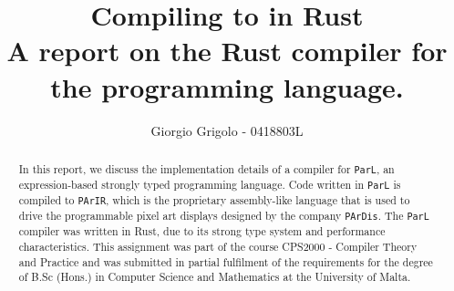 \documentclass{article}
\title{Compiling \code{ParL} to \code{PArIR} in Rust \\{\normalsize A report on the Rust
compiler for the \code{ParL} programming language.}}
\author{Giorgio Grigolo - 0418803L}
\date{}
\newcommand{\code}[1]{\texttt{#1}}
\begin{document}
\vfill

\thispagestyle{empty}
\maketitle
\thispagestyle{empty}

\vfill
\newpage


\thispagestyle{empty}


\newpage

\tableofcontents



\vfill

\begin{abstract}
  \centering
  In this report, we discuss the implementation details of a
  compiler for \code{ParL}, an expression-based strongly typed programming
  language. Code written in \code{ParL} is compiled to \code{PArIR}, which is
  the proprietary assembly-like language that is used to drive the
  programmable pixel art displays designed by the company \code{PArDis}. The
  \code{ParL} compiler was written in Rust, due to its strong type system and
  performance characteristics. This assignment was part of the course CPS2000 -
  Compiler Theory and Practice and was submitted in partial fulfilment of the
  requirements for the degree of B.Sc (Hons.) in Computer Science and
  Mathematics at the University of Malta.
\end{abstract}

\vfill
\newpage

\newpage


\newpage

\newpage


\newpage




\newpage



\newpage
\printbibliography

\newpage



\newpage
\end{document}
